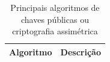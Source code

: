 \documentclass[12pt]{article}
\begin{document}
\begin{table}[H]
\caption{Principais algoritmos de chaves públicas ou criptografia assimétrica}
\label{tab2}
\begin{tabular}{|l|l|}
\hline
Algoritmo                                                  & Descrição                                                                                                                                                                                                                                                                                                                                                                                                                                                                                                                                                                                                                                                                                                                                                                                                                                                                                                                                                                                                                                                                                                                                                                                                                                                                                                                                                                                                                                                                                                                                                                                                                                                                                                                                                                                                                                                                                                                                                                              \\ \hline

\end{tabular}
\end{table}
\end{document}
